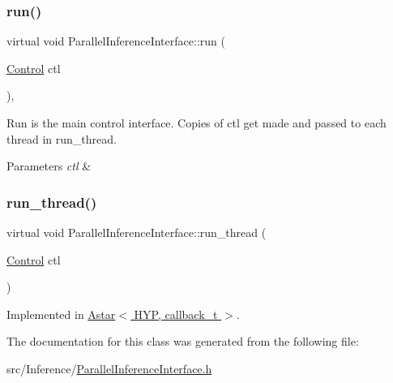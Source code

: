 \subsubsection{\texorpdfstring{run()}{run()}}
{\footnotesize\ttfamily virtual void Parallel\+Inference\+Interface\+::run (\begin{DoxyParamCaption}\item[{\hyperlink{struct_control}{Control}}]{ctl }\end{DoxyParamCaption})\hspace{0.3cm}{\ttfamily [inline]}, {\ttfamily [virtual]}}



Run is the main control interface. Copies of ctl get made and passed to each thread in run\+\_\+thread. 


\begin{DoxyParams}{Parameters}
{\em ctl} & \\
\hline
\end{DoxyParams}
\mbox{\label{class_parallel_inference_interface_ae3f9f1a2128878183869d0cc6c7434f6}} 
\subsubsection{\texorpdfstring{run\+\_\+thread()}{run\_thread()}}
{\footnotesize\ttfamily virtual void Parallel\+Inference\+Interface\+::run\+\_\+thread (\begin{DoxyParamCaption}\item[{\hyperlink{struct_control}{Control}}]{ctl }\end{DoxyParamCaption})\hspace{0.3cm}{\ttfamily [pure virtual]}}



Implemented in \hyperlink{class_astar_a962d234b6b109597c03516d61ff2cffc}{Astar$<$ H\+Y\+P, callback\+\_\+t $>$}.



The documentation for this class was generated from the following file\+:\begin{DoxyCompactItemize}
\item 
src/\+Inference/\hyperlink{_parallel_inference_interface_8h}{Parallel\+Inference\+Interface.\+h}\end{DoxyCompactItemize}
